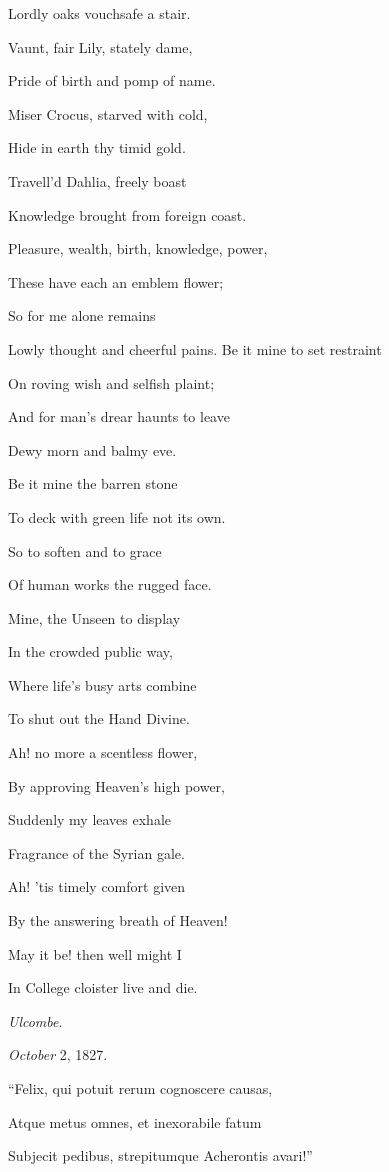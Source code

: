 Lordly oaks vouchsafe a stair.

Vaunt, fair Lily, stately dame,

Pride of birth and pomp of name.

Miser Crocus, starved with cold,

Hide in earth thy timid gold.

Travell'd Dahlia, freely boast

Knowledge brought from foreign coast.

Pleasure, wealth, birth, knowledge, power,

These have each an emblem flower;

So for me alone remains

Lowly thought and cheerful pains. Be it mine to set restraint

On roving wish and selfish plaint;

And for man's drear haunts to leave

Dewy morn and balmy eve.

Be it mine the barren stone

To deck with green life not its own.

So to soften and to grace

Of human works the rugged face.

Mine, the Unseen to display

In the crowded public way,

Where life's busy arts combine

To shut out the Hand Divine.

Ah! no more a scentless flower,

By approving Heaven's high power,

Suddenly my leaves exhale

Fragrance of the Syrian gale.

Ah! 'tis timely comfort given

By the answering breath of Heaven!

May it be! then well might I

In College cloister live and die.

\emph{Ulcombe}.

\emph{October} 2, 1827.


``Felix, qui potuit rerum cognoscere causas,

Atque metus omnes, et inexorabile fatum

Subjecit pedibus, strepitumque Acherontis avari!''

